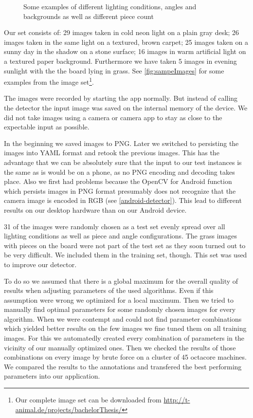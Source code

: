 \begin{figure}
		\caption{Some examples of different lighting conditions, angles and backgrounds as well as different piece count}
		\label{fig:sampeImages}
	\end{figure}

	Our set consists of: 29 images taken in cold neon light on a plain gray desk; 26 images taken in the same light on a textured, brown carpet; 25 images taken on a sunny day in the shadow on a stone surface; 16 images in warm artificial light on a textured paper background. Furthermore we have taken 5 images in evening sunlight with the the board lying in grass. See \autoref{fig:sampeImages} for some examples from the image set\footnote{Our complete image set can be downloaded from \url{http://t-animal.de/projects/bachelorThesis/}}.

	The images were recorded by starting the app normally. But instead of calling the detector the input image was saved on the internal memory of the device. We did not take images using a camera or camera app to stay as close to the expectable input as possible.

	In the beginning we saved images to PNG. Later we switched to persisting the images into YAML format and retook the previous images. This has the advantage that we can be absolutely sure that the input to our test instances is the same as is would be on a phone, as no PNG encoding and decoding takes place. Also we first had problems because the OpenCV for Android function which persists images in PNG format presumably does not recognize that the camera image is encoded in RGB (see \autoref{android-detector}). This lead to different results on our desktop hardware than on our Android device.

	31 of the images were randomly chosen as a test set evenly spread over all lighting conditions as well as piece and angle configurations. The grass images with pieces on the board were not part of the test set as they soon turned out to be very difficult. We included them in the training set, though. This set was used to improve our detector.

	To do so we assumed that there is a global maximum for the overall quality of results when adjusting parameters of the used algorithms. Even if this assumption were wrong we optimized for a local maximum. Then we tried to manually find optimal parameters for some randomly chosen images for every algorithm. When we were contempt and could not find parameter combinations which yielded better results on the few images we fine tuned them on all training images. For this we automatedly created every combination of parameters in the vicinity of our manually optimized ones. Then we checked the results of those combinations on every image by brute force on a cluster of 45 octacore machines. We compared the results to the annotations and transfered the best performing parameters into our application.






